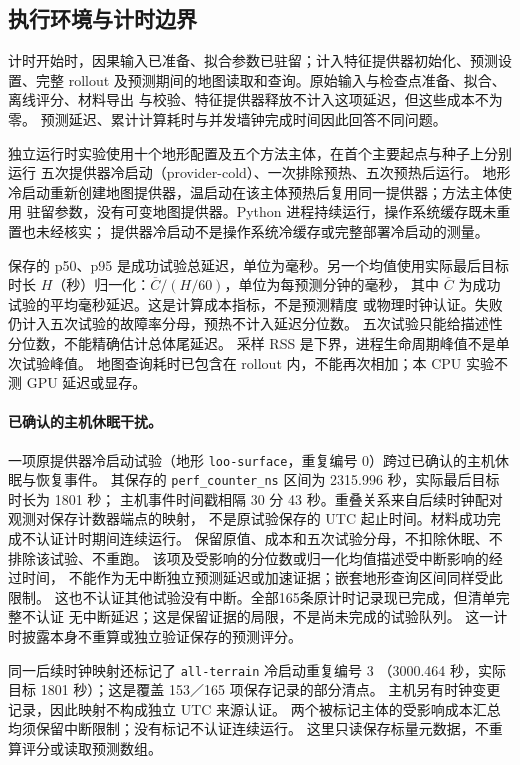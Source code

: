 \documentclass[UTF8,11pt]{ctexart}
\begin{document}
\subsection{执行环境与计时边界}
\label{sec:runtime-environment}
计时开始时，因果输入已准备、拟合参数已驻留；计入特征提供器初始化、预测设置、完整
rollout 及预测期间的地图读取和查询。原始输入与检查点准备、拟合、离线评分、材料导出
与校验、特征提供器释放不计入这项延迟，但这些成本不为零。
预测延迟、累计计算耗时与并发墙钟完成时间因此回答不同问题。

独立运行时实验使用十个地形配置及五个方法主体，在首个主要起点与种子上分别运行
五次提供器冷启动（provider-cold）、一次排除预热、五次预热后运行。
地形冷启动重新创建地图提供器，温启动在该主体预热后复用同一提供器；方法主体使用
驻留参数，没有可变地图提供器。Python 进程持续运行，操作系统缓存既未重置也未经核实；
提供器冷启动不是操作系统冷缓存或完整部署冷启动的测量。

保存的 p50、p95 是成功试验总延迟，单位为毫秒。另一个均值使用实际最后目标时长
\(H\)（秒）归一化：\(\overline C/(H/60)\)，单位为每预测分钟的毫秒，
其中 \(\overline C\) 为成功试验的平均毫秒延迟。这是计算成本指标，不是预测精度
或物理时钟认证。失败仍计入五次试验的故障率分母，预热不计入延迟分位数。
五次试验只能给描述性分位数，不能精确估计总体尾延迟。
采样 RSS 是下界，进程生命周期峰值不是单次试验峰值。
地图查询耗时已包含在 rollout 内，不能再次相加；本 CPU 实验不测 GPU 延迟或显存。

\paragraph{已确认的主机休眠干扰。}
一项原提供器冷启动试验（地形 \texttt{loo-surface}，重复编号 0）跨过已确认的主机休眠与恢复事件。
其保存的 \texttt{perf\_counter\_ns} 区间为 2315.996 秒，实际最后目标时长为 1801 秒；
主机事件时间戳相隔 30 分 43 秒。重叠关系来自后续时钟配对观测对保存计数器端点的映射，
不是原试验保存的 UTC 起止时间。材料成功完成不认证计时期间连续运行。
保留原值、成本和五次试验分母，不扣除休眠、不排除该试验、不重跑。
该项及受影响的分位数或归一化均值描述受中断影响的经过时间，
不能作为无中断独立预测延迟或加速证据；嵌套地形查询区间同样受此限制。
这也不认证其他试验没有中断。全部165条原计时记录现已完成，但清单完整不认证
无中断延迟；这是保留证据的局限，不是尚未完成的试验队列。
这一计时披露本身不重算或独立验证保存的预测评分。

同一后续时钟映射还标记了 \texttt{all-terrain} 冷启动重复编号 3
（3000.464 秒，实际目标 1801 秒）；这是覆盖 153／165 项保存记录的部分清点。
主机另有时钟变更记录，因此映射不构成独立 UTC 来源认证。
两个被标记主体的受影响成本汇总均须保留中断限制；没有标记不认证连续运行。
这里只读保存标量元数据，不重算评分或读取预测数组。
\end{document}
